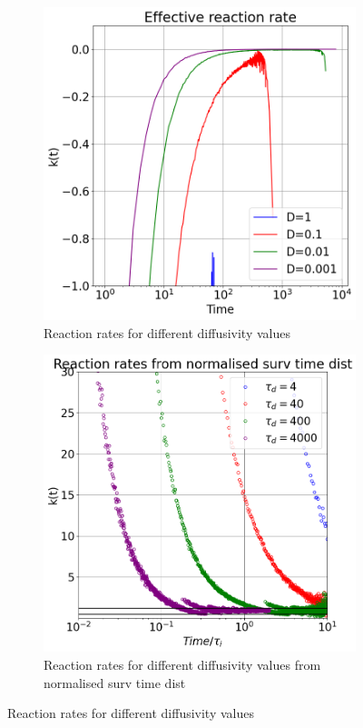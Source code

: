 \documentclass{article}
\begin{document}
\begin{figure}[htbp]
    \centering
    \begin{subfigure}[b]{0.45\textwidth}
        \centering
        \includegraphics[width=\textwidth]{images/compareAdsRatesDiff.png}
        \caption{Reaction rates for different diffusivity values}
    \end{subfigure}
    \hfill
    \begin{subfigure}[b]{0.45\textwidth}
        \centering
        \includegraphics[width=\textwidth]{images/compareDiffNormAdsRates.png}
        \caption{Reaction rates for different diffusivity values from normalised surv time dist}
    \end{subfigure}
    \caption{Reaction rates for different diffusivity values}
    \label{fig:reactionRatesDiff}
\end{figure}
\end{document}
